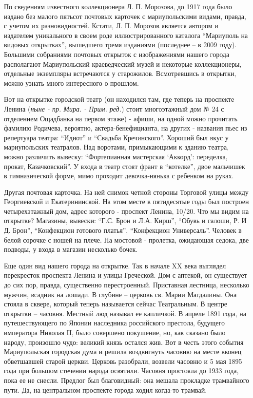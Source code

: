 По сведениям известного коллекционера Л. П. Морозова, до 1917 года было издано
без малого пятьсот почтовых карточек с мариупольскими видами, правда, с учетом
их разновидностей. Кстати, Л. П. Морозов является автором и издателем
уникального в своем роде иллюстрированного каталога \enquote{Мариуполь на видовых
открытках}, вышедшего тремя изданиями (последнее – в 2009 году). Большими
собраниями почтовых открыток с изображениями нашего города располагают
Мариупольский краеведческий музей и некоторые коллек­ционеры, отдельные
экземпляры встречаются у старожилов. Всмотревшись в открытки, можно узнать
много интересного о прошлом.


Вот на открытке городской театр (он находился там, где теперь на проспекте
Ленина (\emph{ныне - пр. Мира. - Прим. ред.}) стоит многоэтажный дом № 24 с отделением
Ощадбанка на первом этаже) - афиши, на одной можно прочитать фамилию Родичева,
вероятно, актера-бенефицианта, на других - названия пьес из репертуара
театра: \enquote{Идиот} и \enquote{Свадьба Кречинского}. Хороший был вкус у мариупольских
театралов. Над воротами, примыкающими к зданию театра, можно различить вывеску:
\enquote{Фортепианная мастерская \enquote{Аккорд}: переделка, прокат, Казачковский}. У входа в
театр стоят франт в \enquote{котелке}, двое мальчишек в гимназической форме, мимо
проходит девочка-нянька с ребенком на руках.


Другая почтовая карточка. На ней снимок четной стороны Торговой улицы между
Георгиевской и Екатерининской. На этом месте в пятидесятые годы был построен
четырехэтажный дом, адрес которого - проспект Ленина, 10/20. Что мы видим на
открытке? Магазины, вывески: \enquote{Г.С. Брон и Л.А. Кирш}, \enquote{Обувь и галоши, Р. И
Д. Брон}, \enquote{Конфекцион готового платья}, \enquote{Конфекцион Универсаль}. Человек в
белой сорочке с ношей на плече. На мостовой - пролетка, ожидающая седока, две
подводы, у входа в магазин несколько бочек.


Еще один вид нашего города на открытке. Так в начале XX века выглядел
перекресток проспекта Ленина и улицы Греческой. Дом с аптекой, он существует до
сих пор, правда, существенно перестроенный. Приставная лестница, несколько
мужчин, всадник на лошади. В глубине – церковь св. Марии Магдалины. Она стояла
в сквере, который теперь называется сейчас Театральным. В центре открытки –
часовня. Местный люд называл ее капличкой. В апреле 1891 года, на
путешествующего по Японии наследника российского престола, будущего императора
Николая II, было совершено покушение, но, как сказано было народу, произошло
чудо: великий князь остался жив. Вот в честь этого события Мариупольская
городская дума и решила воздвигнуть часовню на месте вконец обветшавшей старой
церкви. Церковь разобрали, возвели часовню и 5 мая 1895 года при большом
стечении народа освятили. Часовня простояла до 1933 года, пока ее не снесли.
Предлог был благовидный: она мешала прокладке трамвайного пути. Да, на
центральном проспекте города ходил когда-то трамвай.

